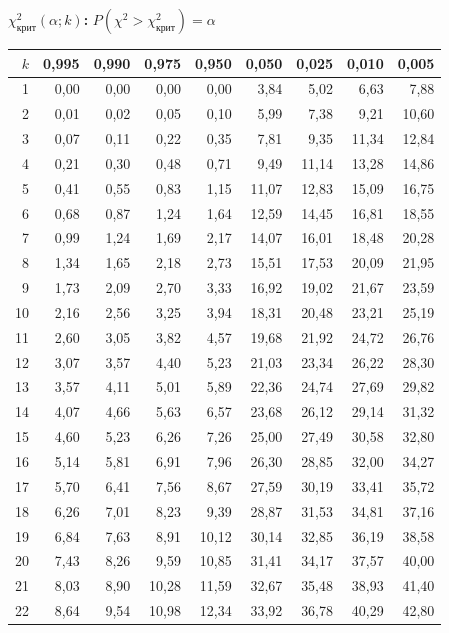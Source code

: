 \documentclass[a4paper,10pt]{extarticle}
\newcommand{\kr}{\text{крит}}\newcommand{\nab}{\text{набл}}
\begin{document}
\begin{minipage}[t]{0.5\textwidth}\centering
\textbf{$\chi^2_\kr(\alpha;k)$:} $P(\chi^2>\chi^2_\kr)=\alpha$\\[2pt]
\begin{tabular}{r|rrrrrrrr}
$k$ & 0,995 & 0,990 & 0,975 & 0,950 & 0,050 & 0,025 & 0,010 & 0,005\\\hline
1 & 0,00 & 0,00 & 0,00 & 0,00 & 3,84 & 5,02 & 6,63 & 7,88\\
2 & 0,01 & 0,02 & 0,05 & 0,10 & 5,99 & 7,38 & 9,21 & 10,60\\
3 & 0,07 & 0,11 & 0,22 & 0,35 & 7,81 & 9,35 & 11,34 & 12,84\\
4 & 0,21 & 0,30 & 0,48 & 0,71 & 9,49 & 11,14 & 13,28 & 14,86\\
5 & 0,41 & 0,55 & 0,83 & 1,15 & 11,07 & 12,83 & 15,09 & 16,75\\
6 & 0,68 & 0,87 & 1,24 & 1,64 & 12,59 & 14,45 & 16,81 & 18,55\\
7 & 0,99 & 1,24 & 1,69 & 2,17 & 14,07 & 16,01 & 18,48 & 20,28\\
8 & 1,34 & 1,65 & 2,18 & 2,73 & 15,51 & 17,53 & 20,09 & 21,95\\
9 & 1,73 & 2,09 & 2,70 & 3,33 & 16,92 & 19,02 & 21,67 & 23,59\\
10 & 2,16 & 2,56 & 3,25 & 3,94 & 18,31 & 20,48 & 23,21 & 25,19\\
11 & 2,60 & 3,05 & 3,82 & 4,57 & 19,68 & 21,92 & 24,72 & 26,76\\
12 & 3,07 & 3,57 & 4,40 & 5,23 & 21,03 & 23,34 & 26,22 & 28,30\\
13 & 3,57 & 4,11 & 5,01 & 5,89 & 22,36 & 24,74 & 27,69 & 29,82\\
14 & 4,07 & 4,66 & 5,63 & 6,57 & 23,68 & 26,12 & 29,14 & 31,32\\
15 & 4,60 & 5,23 & 6,26 & 7,26 & 25,00 & 27,49 & 30,58 & 32,80\\
16 & 5,14 & 5,81 & 6,91 & 7,96 & 26,30 & 28,85 & 32,00 & 34,27\\
17 & 5,70 & 6,41 & 7,56 & 8,67 & 27,59 & 30,19 & 33,41 & 35,72\\
18 & 6,26 & 7,01 & 8,23 & 9,39 & 28,87 & 31,53 & 34,81 & 37,16\\
19 & 6,84 & 7,63 & 8,91 & 10,12 & 30,14 & 32,85 & 36,19 & 38,58\\
20 & 7,43 & 8,26 & 9,59 & 10,85 & 31,41 & 34,17 & 37,57 & 40,00\\
21 & 8,03 & 8,90 & 10,28 & 11,59 & 32,67 & 35,48 & 38,93 & 41,40\\
22 & 8,64 & 9,54 & 10,98 & 12,34 & 33,92 & 36,78 & 40,29 & 42,80\\

\end{tabular}
\end{minipage}
\end{document}
